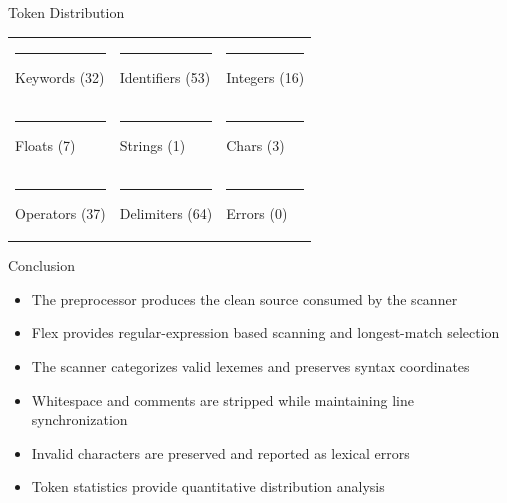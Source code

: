 \documentclass[aspectratio=169]{beamer}
\begin{document}
\begin{frame}{Token Distribution}
\vspace{-0.3cm}
\begin{center}\scriptsize
\begin{tabular}{lll}
\textcolor{keywordcolor}{\rule{0.25cm}{0.25cm}} Keywords (32) & \textcolor{identifiercolor}{\rule{0.25cm}{0.25cm}} Identifiers (53) & \textcolor{integercolor}{\rule{0.25cm}{0.25cm}} Integers (16) \\
\textcolor{floatcolor}{\rule{0.25cm}{0.25cm}} Floats (7) & \textcolor{stringcolor}{\rule{0.25cm}{0.25cm}} Strings (1) & \textcolor{charcolor}{\rule{0.25cm}{0.25cm}} Chars (3) \\
\textcolor{operatorcolor}{\rule{0.25cm}{0.25cm}} Operators (37) & \textcolor{delimitercolor}{\rule{0.25cm}{0.25cm}} Delimiters (64) & \textcolor{errorcolor}{\rule{0.25cm}{0.25cm}} Errors (0)
\end{tabular}
\end{center}
\end{frame}

\begin{frame}{Conclusion}
\begin{itemize}
\item The preprocessor produces the clean source consumed by the scanner
\item Flex provides regular-expression based scanning and longest-match selection
\item The scanner categorizes valid lexemes and preserves syntax coordinates
\item Whitespace and comments are stripped while maintaining line synchronization
\item Invalid characters are preserved and reported as lexical errors
\item Token statistics provide quantitative distribution analysis
\end{itemize}
\end{frame}
\end{document}
